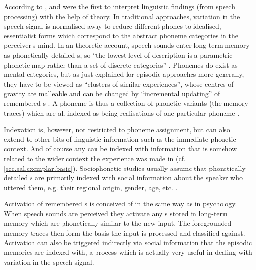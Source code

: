 According to \textcite[cf.][517]{pierrehumbert2006}, \textcite{goldinger1996} and \textcite{johnson1997} were the first to interpret linguistic findings (from speech processing) with the help of  theory.
In traditional approaches, variation in the speech signal is normalised away to reduce different phones to idealised, essentialist forms which correspond to the abstract phoneme categories in the perceiver's mind.
In an  theoretic account, speech sounds enter long-term memory as phonetically detailed s, so ``the lowest level of description is a parametric phonetic map rather than a set of discrete categories'' \parencite[519]{pierrehumbert2006}.
Phonemes do exist as mental categories, but as just explained for episodic approaches more generally, they have to be viewed as ``clusters of similar experiences'', whose centres of gravity are malleable and can be changed by ``incremental updating'' of remembered s \parencite[cf.][519]{pierrehumbert2006}.
A phoneme is thus a collection of phonetic variants (the memory traces) which are all indexed as being realisations of one particular phoneme \parencite[cf.][113]{pierrehumbert2002}.

Indexation is, however, not restricted to phoneme assignment, but can also extend to other bits of linguistic information such as the immediate phonetic context.
And of course any  can be indexed with information that is somehow related to the wider context the experience was made in (cf. \ref{sec.sal.exemplar.basic}).
Sociophonetic studies usually assume that phonetically detailed s are primarily indexed with social information about the speaker who uttered them, e.g. their regional origin, gender, age, etc. \parencite[cf.][370]{hayetal2006a}.

Activation of remembered s is conceived of in the same way as in psychology.
When speech sounds are perceived they activate any s stored in long-term memory which are phonetically similar to the new input.
The foregrounded memory traces then form the basis the input is processed and classified against.
Activation can also be triggered indirectly via social information that the episodic memories are indexed with, a process which is actually very useful in dealing with variation in the speech signal.

